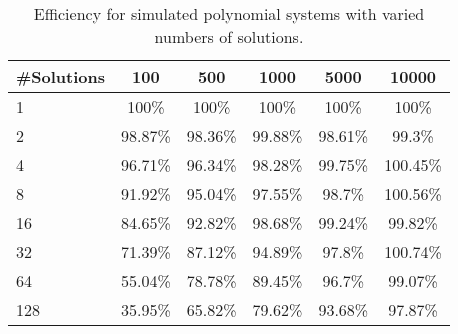 \begin{table}[h]
\centering
\begin{tabular}{l||c|c|c|c|c|}
\#Solutions & 100 & 500 & 1000 & 5000 & 10000\\ \hline
1 & 100\% & 100\% & 100\% & 100\% & 100\%\\
2 & 98.87\% & 98.36\% & 99.88\% & 98.61\% & 99.3\%\\
4 & 96.71\% & 96.34\% & 98.28\% & 99.75\% & 100.45\%\\
8 & 91.92\% & 95.04\% & 97.55\% & 98.7\% & 100.56\%\\
16 & 84.65\% & 92.82\% & 98.68\% & 99.24\% & 99.82\%\\
32 & 71.39\% & 87.12\% & 94.89\% & 97.8\% & 100.74\%\\
64 & 55.04\% & 78.78\% & 89.45\% & 96.7\% & 99.07\%\\
128 & 35.95\% & 65.82\% & 79.62\% & 93.68\% & 97.87\%\\
\end{tabular}
\caption{Efficiency for simulated polynomial systems with varied numbers of solutions.}
\label{FakeParallelEfficiency}
\end{table}
